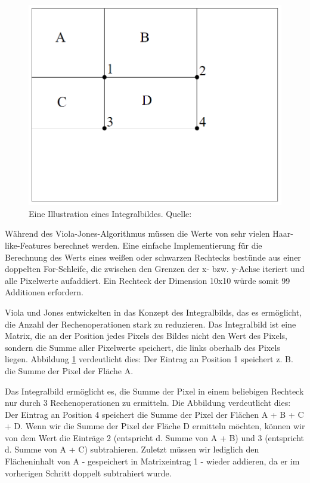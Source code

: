 \documentclass[doktyp=semarbeit, sprache=german]{TUBAFarbeiten}
\begin{document}
\begin{figure}
	\centering
	\includegraphics[width=0.7\linewidth]{images/integral}
	\caption[Integralbild]{Eine Illustration eines Integralbildes. Quelle: \cite{Viola01rapidobject}}
	\label{fig:integral}
\end{figure}


Während des Viola-Jones-Algorithmus müssen die Werte von sehr vielen Haar-like-Features berechnet werden. Eine einfache Implementierung für die Berechnung des Werts eines weißen oder schwarzen Rechtecks bestünde aus einer doppelten For-Schleife, die zwischen den Grenzen der x- bzw. y-Achse iteriert und alle Pixelwerte aufaddiert. Ein Rechteck der Dimension 10x10 würde somit 99 Additionen erfordern.

Viola und Jones entwickelten in \cite{Viola01rapidobject} das Konzept des Integralbilds, das es ermöglicht, die Anzahl der Rechenoperationen stark zu reduzieren. Das Integralbild ist eine Matrix, die an der Position jedes Pixels des Bildes nicht den Wert des Pixels, sondern die Summe aller Pixelwerte speichert, die links oberhalb des Pixels liegen. Abbildung \ref{fig:integral} verdeutlicht dies: Der Eintrag an Position 1 speichert z. B. die Summe der Pixel der Fläche A.

Das Integralbild ermöglicht es, die Summe der Pixel in einem beliebigen Rechteck nur durch 3 Rechenoperationen zu ermitteln. Die Abbildung verdeutlicht dies: Der Eintrag an Position 4 speichert die Summe der Pixel der Flächen A + B + C + D. Wenn wir die Summe der Pixel der Fläche D ermitteln möchten, können wir von dem Wert die Einträge 2 (entspricht d. Summe von A + B) und 3 (entspricht d. Summe von A + C) subtrahieren. Zuletzt müssen wir lediglich den Flächeninhalt von A - gespeichert in Matrixeintrag 1 - wieder addieren, da er im vorherigen Schritt doppelt subtrahiert wurde. 
\end{document}

